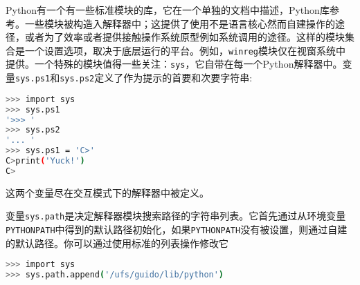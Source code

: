 \documentclass[../modules.tex]{subfiles}
\begin{document}
Python有一个有一些标准模块的库，它在一个单独的文档中描述，Python库参考。一些模块被构造入解释器中；这提供了使用不是语言核心然而自建操作的途径，或者为了效率或者提供接触操作系统原型例如系统调用的途径。这样的模块集合是一个设置选项，取决于底层运行的平台。例如，\lstinline{winreg}模块仅在视窗系统中提供。一个特殊的模块值得一些关注：\lstinline{sys}，它自带在每一个Python解释器中。变量\lstinline{sys.ps1}和\lstinline{sys.ps2}定义了作为提示的首要和次要字符串:
\begin{lstlisting}[language=bash]
>>> import sys
>>> sys.ps1
'>>> '
>>> sys.ps2
'... '
>>> sys.ps1 = 'C>'
C>print('Yuck!')
C>
\end{lstlisting}
这两个变量尽在交互模式下的解释器中被定义。

变量\lstinline{sys.path}是决定解释器模块搜索路径的字符串列表。它首先通过从环境变量\lstinline{PYTHONPATH}中得到的默认路径初始化，如果\lstinline{PYTHONPATH}没有被设置，则通过自建的默认路径。你可以通过使用标准的列表操作修改它
\begin{lstlisting}[language=bash]
>>> import sys
>>> sys.path.append('/ufs/guido/lib/python')
\end{lstlisting}
\end{document}
